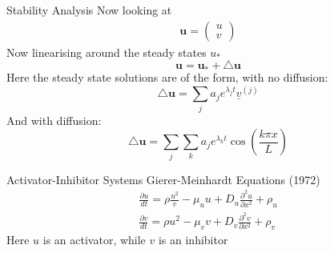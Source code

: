 \documentclass[pdf]{beamer}
\begin{document}
\begin{frame}{Stability Analysis}
	Now looking at
\begin{align}	
	\mathbf{u} =
\left(		
	\begin{array}{c}
	u \\
	v
	\end{array}
	\right)
	\end{align}
	Now linearising around the steady states $ u_* $	
	\begin{equation}
		\mathbf{u} = \mathbf{u}_*+ \triangle \mathbf{u}	
	\end{equation}
	Here the steady state solutions are of the form, with no diffusion:
	\begin{equation}
	\triangle \mathbf{u} = \sum_j a_j e^{\lambda_j t}\underline{v}^{(j)}
	\end{equation}
	And with diffusion:
	\begin{equation}
	\triangle \mathbf{u} = \sum_j\sum_k a_j e^{\lambda_k t}\cos(\frac{k\pi x}{L})
	\end{equation}
\end{frame}



\begin{frame}{Activator-Inhibitor Systems}
	Gierer-Meinhardt Equations (1972)
		\begin{align}
    		\frac{\partial u}{dt} = \rho \frac{u^2}{v} - \mu_u u + D_u \frac{\partial^2 u}{\partial x^2} + \rho_u \\
    		\frac{\partial v}{dt} = \rho u^2 - \mu_v v + D_v \frac{\partial^2 v}{\partial x^2} + \rho_v
    	\end{align}
    Here $ u $ is an activator, while $ v $ is an inhibitor
\end{frame}
\end{document}
